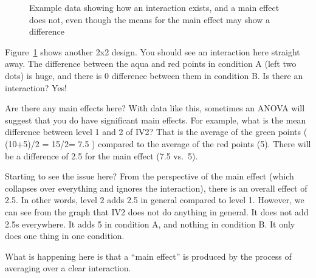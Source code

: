 \documentclass[
  letterpaper,
  DIV=11,
  numbers=noendperiod]{scrreprt}
\begin{document}
\begin{figure}


\caption{\label{fig-11mainintInc}Example data showing how an interaction
exists, and a main effect does not, even though the means for the main
effect may show a difference}

\end{figure}%

Figure~\ref{fig-11mainintInc} shows another 2x2 design. You should see
an interaction here straight away. The difference between the aqua and
red points in condition A (left two dots) is huge, and there is 0
difference between them in condition B. Is there an interaction? Yes!

Are there any main effects here? With data like this, sometimes an ANOVA
will suggest that you do have significant main effects. For example,
what is the mean difference between level 1 and 2 of IV2? That is the
average of the green points ( (10+5)/2 = 15/2= 7.5 ) compared to the
average of the red points (5). There will be a difference of 2.5 for the
main effect (7.5 vs.~5).

Starting to see the issue here? From the perspective of the main effect
(which collapses over everything and ignores the interaction), there is
an overall effect of 2.5. In other words, level 2 adds 2.5 in general
compared to level 1. However, we can see from the graph that IV2 does
not do anything in general. It does not add 2.5s everywhere. It adds 5
in condition A, and nothing in condition B. It only does one thing in
one condition.

What is happening here is that a ``main effect'' is produced by the
process of averaging over a clear interaction.
\end{document}
